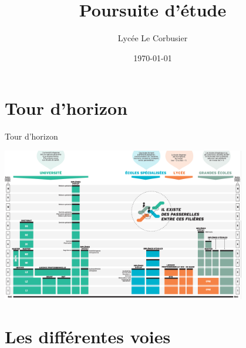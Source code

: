 \documentclass[usenames,dvipsnames,13pt,aspectratio=169]{beamer}
\title[Integrated Mill Systems Beamer Theme]{Poursuite d'étude}
\date[\today]{\small\today}
\author[Luke Skywalker]{
  Lycée Le Corbusier
  \pdfnewline
  \texttt{}
}
\institute{BTS CPRP 1}
\begin{document}
\begin{frame}
\titlepage
\end{frame}

\begin{frame}{\contentsname}
\tableofcontents
\end{frame}







\section{Tour d'horizon}
\begin{frame}{Tour d'horizon}

	\begin{center}
	     \includegraphics[width=0.8\textwidth]{SCH1.PNG}
	\end{center}


\end{frame}







\section{Les différentes voies}
\end{document}
